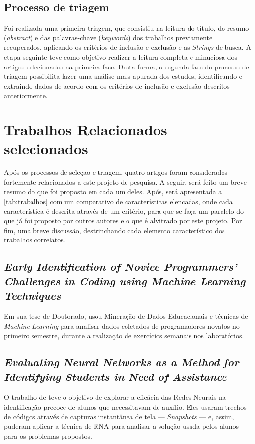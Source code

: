 \documentclass[
	12pt,				%
	openright,			%
	oneside,
	a4paper,			%
	english,			%
	french,				%
	spanish,			%
	brazil,				%
	]{abntex2}
\begin{document}
\subsection{Processo de triagem}
Foi realizada uma primeira triagem, que consistiu na leitura do título, do resumo (\textit{abstract}) e das palavras-chave (\textit{keywords}) dos trabalhos previamente recuperados, aplicando os critérios de inclusão e exclusão e as \textit{Strings} de busca.
A etapa seguinte teve como objetivo realizar a leitura completa e minuciosa dos artigos selecionados na primeira fase. Desta forma, a segunda fase do processo de triagem possibilita fazer uma análise mais apurada dos estudos, identificando e extraindo dados de acordo com os critérios de inclusão e exclusão descritos anteriormente.

\section{Trabalhos Relacionados selecionados}
Após os processos de seleção e triagem, quatro artigos foram considerados fortemente relacionados a este projeto de pesquisa. A seguir, será feito um breve resumo do que foi proposto em cada um deles. Após, será apresentada a \autoref{tab:trabalhos} com um comparativo de características elencadas, onde cada característica é descrita através de um critério, para que se faça um paralelo do que já foi proposto por outros autores e o que é alvitrado por este projeto. Por fim, uma breve discussão, destrinchando cada elemento característico dos trabalhos correlatos.

\subsection{\textit{Early Identification of Novice Programmers' Challenges in Coding using Machine Learning Techniques}} \label{sec:Early}
Em sua tese de Doutorado,  usou Mineração de Dados Educacionais e técnicas de \textit{Machine Learning} para analisar dados coletados de programadores novatos no primeiro semestre, durante a realização de exercícios semanais nos laboratórios.

\subsection{\textit{Evaluating Neural Networks as a Method for Identifying Students in Need of Assistance}} \label{sec:Evaluating}
O trabalho de  teve o objetivo de explorar a eficácia das Redes Neurais na identificação precoce de alunos que necessitavam de auxílio. Eles usaram trechos de códigos através de capturas instantânea de tela --- \textit{Snapshots} --- e, assim, puderam aplicar a técnica de RNA para analisar a solução usada pelos alunos para os problemas propostos.
\end{document}
